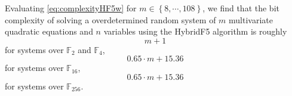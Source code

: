 Evaluating \eqref{eq:complexityHF5w} for $m \in \left\{8,\cdots,108\right\}$, we find that the bit complexity of solving a overdetermined random system  of $m$ multivariate quadratic equations and $n$ variables using the HybridF5 algorithm is roughly
\begin{equation}
m+1
\label{eq:HF5_gf2_4}
\end{equation}
for systems over $\mathbb{F}_2$ and $\mathbb{F}_4$,
\begin{equation}
0.65\cdot m+15.36
\label{eq:HF5_gf16}
\end{equation}
for systems over $\mathbb{F}_{16}$,
\begin{equation}
0.65\cdot m+15.36
\label{eq:HF5_gf256}
\end{equation}
for systems over $\mathbb{F}_{256}$.






